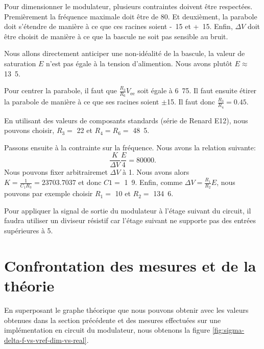 Pour dimensionner le modulateur, plusieurs contraintes doivent
être respectées. Premièrement la fréquence maximale doit être
de \unit{80}{\kilo\hertz}. Et deuxièment, la parabole doit s'étendre
de manière à ce que ces racines soient \unit{-15}{\volt} et
\unit{+15}{\volt}. Enfin, $\Delta V$ doit être choisit de manière
à ce que la bascule ne soit pas sensible au bruit.

Nous allons directement anticiper une non-idéalité de la bascule,
la valeur de saturation $E$ n'est pas égale à la tension
d'alimention. Nous avons plutôt $E \approx$ \unit{13.5}{\volt}.

Pour centrer la parabole, il faut que $\frac{R_3}{R_6}V_{\text{ee}}$
soit égale à \unit{6.75}{\volt}. Il faut ensuite étirer la
parabole de manière à ce que ses racines soient $\pm$\unit{15}{\volt}.
Il faut donc $\frac{R_3}{R_4} = 0.45$. 

En utilisant des valeurs de composants standards (série de Renard E12), 
nous pouvons choisir, $R_3 =$ \unit{22}{\kilo\ohm} et $R_4 = R_6 =
$ \unit{48.5}{\kilo\ohm}.

Passons ensuite à la contrainte sur la fréquence. Nous avons la 
relation suivante:
\[ \frac{K}{\Delta V}\frac{E}{4} = 80000.\]
Nous pouvons fixer arbitrairemet $\Delta V$ à \unit{1}{\volt}. Nous avons alors
$K = \frac{1}{C_1R_3} = 23703.7037$ et donc $C1 =$ \unit{1.9}{\nano\farad}.
Enfin, comme $\Delta V = \frac{R_1}{R_2}E$, nous pouvons par exemple
choisir $R_1 =$ \unit{10}{\kilo\ohm} et $R_2 =$ \unit{134.6}{\kilo\ohm}.


Pour appliquer la signal de sortie du modulateur
à l'étage suivant du circuit, il faudra utiliser un diviseur
résistif car l'étage suivant ne supporte pas des entrées supérieures
à \unit{5}{\volt}.

\section{Confrontation des mesures et de la théorie}
En superposant le graphe théorique que nous pouvons obtenir avec les valeurs
obtenues dans la section précédente
et des mesures effectuées sur une implémentation en circuit
du modulateur, nous obtenons la figure \ref{fig:sigma-delta-f-vs-vref-dim-vs-real}.

